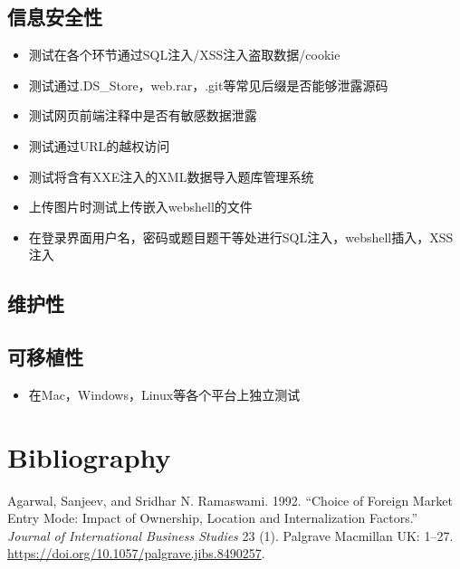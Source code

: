 \documentclass[hyperref, a4paper]{ctexart}
\providecommand{\tightlist}{%
  \setlength{\itemsep}{0pt}\setlength{\parskip}{0pt}}
\begin{document}
\hypertarget{ux4fe1ux606fux5b89ux5168ux6027}{%
\subsection{信息安全性}\label{ux4fe1ux606fux5b89ux5168ux6027}}

\begin{itemize}
\tightlist
\item
  测试在各个环节通过SQL注入/XSS注入盗取数据/cookie
\item
  测试通过.DS\_Store，web.rar，.git等常见后缀是否能够泄露源码
\item
  测试网页前端注释中是否有敏感数据泄露
\item
  测试通过URL的越权访问
\item
  测试将含有XXE注入的XML数据导入题库管理系统
\item
  上传图片时测试上传嵌入webshell的文件
\item
  在登录界面用户名，密码或题目题干等处进行SQL注入，webshell插入，XSS注入
\end{itemize}

\hypertarget{ux7ef4ux62a4ux6027}{%
\subsection{维护性}\label{ux7ef4ux62a4ux6027}}

\hypertarget{ux53efux79fbux690dux6027}{%
\subsection{可移植性}\label{ux53efux79fbux690dux6027}}

\begin{itemize}
\tightlist
\item
  在Mac，Windows，Linux等各个平台上独立测试
\end{itemize}

\pagebreak

\hypertarget{bibliography}{%
\section*{Bibliography}\label{bibliography}}

\hypertarget{refs}{}
\leavevmode\hypertarget{ref-innovative4}{}%
Agarwal, Sanjeev, and Sridhar N. Ramaswami. 1992. ``Choice of Foreign
Market Entry Mode: Impact of Ownership, Location and Internalization
Factors.'' \emph{Journal of International Business Studies} 23 (1).
Palgrave Macmillan UK: 1--27.
\url{https://doi.org/10.1057/palgrave.jibs.8490257}.
\end{document}
